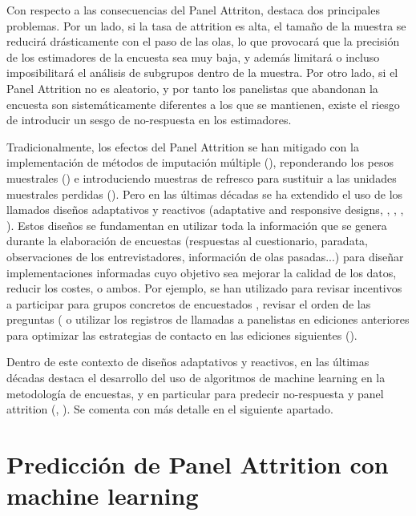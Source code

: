 Con respecto a las consecuencias del Panel Attriton, \cite{lynn2018tackling} destaca dos principales problemas. Por un lado, si la tasa de attrition es alta, el tamaño de la muestra se reducirá drásticamente con el paso de las olas, lo que provocará que la precisión de los estimadores de la encuesta sea muy baja, y además limitará o incluso imposibilitará el análisis de subgrupos dentro de la muestra. Por otro lado, si el Panel Attrition no es aleatorio, y por tanto los panelistas que abandonan la encuesta son sistemáticamente diferentes a los que se mantienen, existe el riesgo de introducir un sesgo de no-respuesta en los estimadores.

Tradicionalmente, los efectos del Panel Attrition se han mitigado con la implementación de métodos de imputación múltiple (\cite{rubin1987multiple}), reponderando los pesos muestrales (\cite{groves2009survey}) e introduciendo muestras de refresco para sustituir a las unidades muestrales perdidas (\cite{hirano1998combining}). Pero en las últimas décadas se ha extendido el uso de los llamados diseños adaptativos y reactivos (adaptative and responsive designs, \cite{groves2006responsive}, \cite{wagner2008adaptive}, \cite{schouten2017adaptive}, \cite{tourangeau2017adaptive}). Estos diseños se fundamentan en utilizar toda la información que se genera durante la elaboración de encuestas (respuestas al cuestionario, paradata, observaciones de los entrevistadores, información de olas pasadas...) para diseñar implementaciones informadas cuyo objetivo sea mejorar la calidad de los datos, reducir los costes, o ambos. Por ejemplo, se han utilizado para revisar incentivos a participar para grupos concretos de encuestados \cite{mcgonagle2022effects}, revisar el orden de las preguntas (\cite{early2017dynamic} o utilizar los registros de llamadas a panelistas en ediciones anteriores para optimizar las estrategias de contacto en las ediciones siguientes (\cite{kreuter2015note}).

Dentro de este contexto de diseños adaptativos y reactivos, en las últimas décadas destaca el desarrollo del uso de algoritmos de machine learning en la metodología de encuestas, y en particular para predecir no-respuesta y panel attrition (\cite{buskirk2018introduction}, \cite{kern2019tree}). Se comenta con más detalle en el siguiente apartado.

\section{Predicción de Panel Attrition con machine learning}


